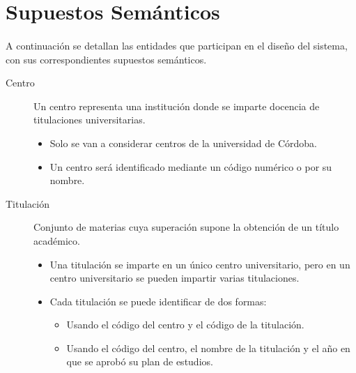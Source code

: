 \section{Supuestos Semánticos}\label{supSem}

   \paragraph{}A continuación se detallan las entidades que participan en el
   diseño del sistema, con sus correspondientes supuestos semánticos.

   \begin{description}

      \item[Centro] Un centro representa una institución donde se imparte
      docencia de titulaciones universitarias.
      \begin{itemize}
         \item Solo se van a considerar centros de la universidad de Córdoba.
         \item Un centro será identificado mediante un código numérico o por su
         nombre.
      \end{itemize}

      \item[Titulación] Conjunto de materias cuya superación supone la obtención
      de un título académico.
      \begin{itemize}
         \item Una titulación se imparte en un único centro universitario, pero
         en un centro universitario se pueden impartir varias titulaciones.
         \item Cada titulación se puede identificar de dos formas:
         \begin{itemize}
            \item Usando el código del centro y el código de la titulación.
            \item Usando el código del centro, el nombre de la titulación y el
            año en que se aprobó su plan de estudios.
         \end{itemize}
      \end{itemize}


\end{description}
